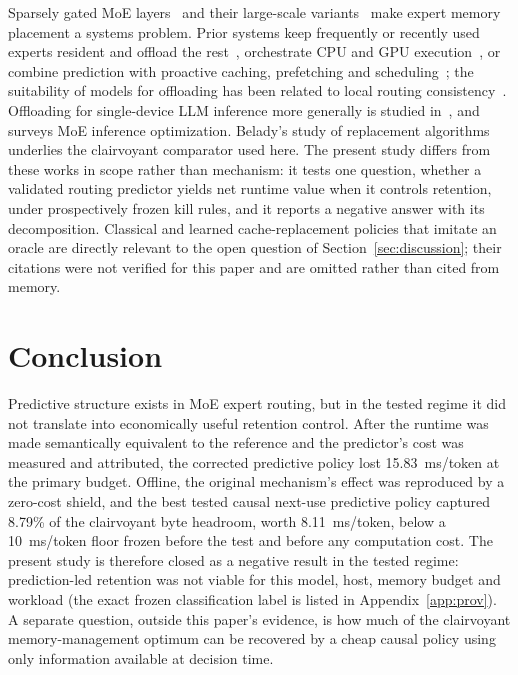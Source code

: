 \documentclass[11pt]{article}
\theoremstyle{plain}
\theoremstyle{definition}
\begin{document}
Sparsely gated MoE layers~\cite{shazeer2017sparsely} and their large-scale variants~\cite{fedus2022switch} make expert memory placement a systems problem. Prior systems keep frequently or recently used experts resident and offload the rest~\cite{eliseev2023offloading,xue2025moeinfinity}, orchestrate CPU and GPU execution~\cite{kamahori2025fiddler}, or combine prediction with proactive caching, prefetching and scheduling~\cite{promoe2025,layerscope2025,expertflow2026}; the suitability of models for offloading has been related to local routing consistency~\cite{localroutingconsistency2025}. Offloading for single-device LLM inference more generally is studied in~\cite{sheng2023flexgen}, and~\cite{liu2026survey} surveys MoE inference optimization. Belady's study of replacement algorithms~\cite{belady1966replacement} underlies the clairvoyant comparator used here. The present study differs from these works in scope rather than mechanism: it tests one question, whether a validated routing predictor yields net runtime value when it controls retention, under prospectively frozen kill rules, and it reports a negative answer with its decomposition. Classical and learned cache-replacement policies that imitate an oracle are directly relevant to the open question of Section~\ref{sec:discussion}; their citations were not verified for this paper and are omitted rather than cited from memory.

\section{Conclusion}
\label{sec:conclusion}

Predictive structure exists in MoE expert routing, but in the tested regime it did not translate into economically useful retention control. After the runtime was made semantically equivalent to the reference and the predictor's cost was measured and attributed, the corrected predictive policy lost 15.83~ms/token at the primary budget. Offline, the original mechanism's effect was reproduced by a zero-cost shield, and the best tested causal next-use predictive policy captured 8.79\% of the clairvoyant byte headroom, worth 8.11~ms/token, below a 10~ms/token floor frozen before the test and before any computation cost. The present study is therefore closed as a negative result in the tested regime: prediction-led retention was not viable for this model, host, memory budget and workload (the exact frozen classification label is listed in Appendix~\ref{app:prov}). A separate question, outside this paper's evidence, is how much of the clairvoyant memory-management optimum can be recovered by a cheap causal policy using only information available at decision time.
\end{document}
